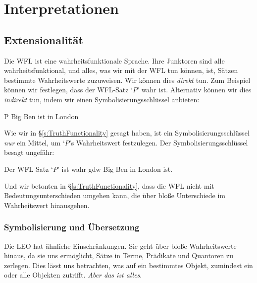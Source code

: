 \part{Interpretationen}
\label{ch.semantics}


\chapter{Extensionalität}\label{s:Interpretations}

Die WFL ist eine wahrheitsfunktionale Sprache. Ihre Junktoren sind alle wahrheitsfunktional, und alles, was wir mit der WFL tun können, ist, Sätzen bestimmte Wahrheitswerte zuzuweisen. Wir können dies \emph{direkt} tun. Zum Beispiel können wir festlegen, dass der WFL-Satz `$P$' wahr ist. Alternativ können wir dies \emph{indirekt} tun, indem wir einen Symbolisierungsschlüssel anbieten:
	\begin{ekey}
		\item[P] Big Ben ist in London
	\end{ekey}
Wie wir in \S\ref{s:TruthFunctionality} gesagt haben, ist ein Symbolisierungsschlüssel \emph{nur} ein Mittel, um `$P$'s Wahrheitswert festzulegen. Der Symbolisierungsschlüssel besagt ungefähr:
	\begin{ebullet}
		\item Der WFL Satz `$P$' ist wahr gdw Big Ben in London ist.
	\end{ebullet}
Und wir betonten in \S\ref{s:TruthFunctionality}, dass die WFL nicht mit Bedeutungsunterschieden umgehen kann, die über blo{\ss}e Unterschiede im Wahrheitswert hinausgehen. 

\section{Symbolisierung und Übersetzung}
Die LEO hat ähnliche Einschränkungen. Sie geht über blo{\ss}e Wahrheitswerte hinaus, da sie uns ermöglicht, Sätze in Terme, Prädikate und Quantoren zu zerlegen. Dies lässt uns betrachten, was auf ein bestimmtes Objekt, zumindest ein oder alle Objekten zutrifft. \emph{Aber das ist alles}.

